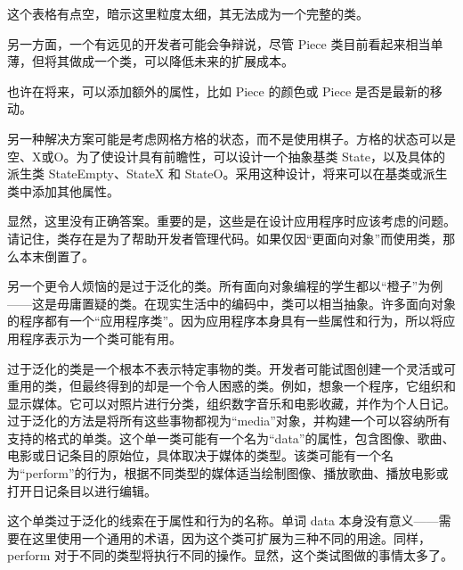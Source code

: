 这个表格有点空，暗示这里粒度太细，其无法成为一个完整的类。

另一方面，一个有远见的开发者可能会争辩说，尽管 Piece 类目前看起来相当单薄，但将其做成一个类，可以降低未来的扩展成本。

也许在将来，可以添加额外的属性，比如 Piece 的颜色或 Piece 是否是最新的移动。

另一种解决方案可能是考虑网格方格的状态，而不是使用棋子。方格的状态可以是空、X或O。为了使设计具有前瞻性，可以设计一个抽象基类 State，以及具体的派生类 StateEmpty、StateX 和 StateO。采用这种设计，将来可以在基类或派生类中添加其他属性。

显然，这里没有正确答案。重要的是，这些是在设计应用程序时应该考虑的问题。请记住，类存在是为了帮助开发者管理代码。如果仅因“更面向对象”而使用类，那么本末倒置了。


另一个更令人烦恼的是过于泛化的类。所有面向对象编程的学生都以“橙子”为例——这是毋庸置疑的类。在现实生活中的编码中，类可以相当抽象。许多面向对象的程序都有一个“应用程序类”。因为应用程序本身具有一些属性和行为，所以将应用程序表示为一个类可能有用。

过于泛化的类是一个根本不表示特定事物的类。开发者可能试图创建一个灵活或可重用的类，但最终得到的却是一个令人困惑的类。例如，想象一个程序，它组织和显示媒体。它可以对照片进行分类，组织数字音乐和电影收藏，并作为个人日记。过于泛化的方法是将所有这些事物都视为“media”对象，并构建一个可以容纳所有支持的格式的单类。这个单一类可能有一个名为“data”的属性，包含图像、歌曲、电影或日记条目的原始位，具体取决于媒体的类型。该类可能有一个名为“perform”的行为，根据不同类型的媒体适当绘制图像、播放歌曲、播放电影或打开日记条目以进行编辑。

这个单类过于泛化的线索在于属性和行为的名称。单词 data 本身没有意义——需要在这里使用一个通用的术语，因为这个类可扩展为三种不同的用途。同样，perform 对于不同的类型将执行不同的操作。显然，这个类试图做的事情太多了。






















